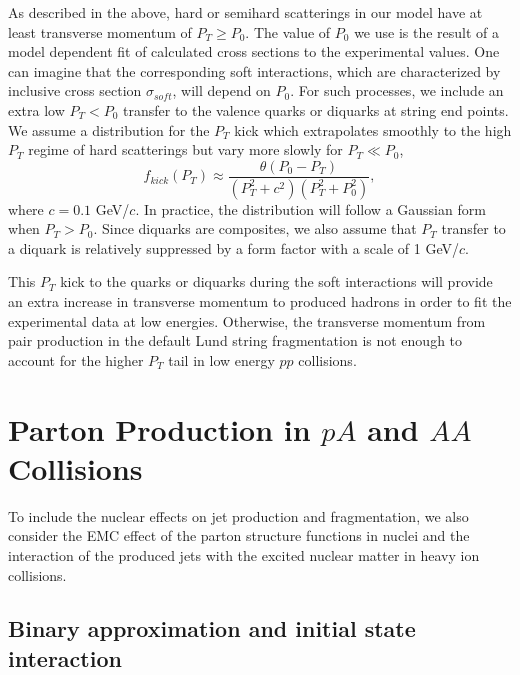         As described in the above, hard or semihard scatterings in our 
model have at least transverse momentum of $P_T\geq P_0$. The value of 
$P_0$ we use is the result of a model dependent fit of calculated cross 
sections to the experimental values. One can imagine that the 
corresponding soft interactions, which are characterized by inclusive
cross section $\sigma_{soft}$, will depend on $P_0$. For such 
processes, we include an extra low $P_T<P_0$ transfer to the 
valence quarks or diquarks at string end points. We assume a 
distribution for the $P_T$ kick which extrapolates smoothly to
the high $P_T$ regime of hard scatterings but vary more slowly
for $P_T\ll P_0$,
\begin{equation}
        f_{kick}(P_T)\approx\frac{\theta(P_0-P_T)}{(P_T^2+c^2)
        (P_T^2+P_{0}^2)},\label{eq:kick}
\end{equation}
where $c=0.1$ GeV/$c$. In practice, the distribution will follow
a Gaussian form when $P_T>P_0$. Since diquarks are composites, 
we also assume that $P_T$ transfer to a diquark is relatively 
suppressed by a form factor with a scale of 1 GeV/$c$.

        This $P_T$ kick to the quarks or diquarks during the soft 
interactions will provide an extra increase in transverse momentum 
to produced hadrons in order to fit the experimental data at low
energies\cite{hijing}. Otherwise, the transverse momentum from pair 
production in the default Lund string fragmentation is not enough 
to account for the higher $P_T$ tail in low energy $pp$ collisions.

\section{Parton Production in $pA$ and $AA$ Collisions}

        To include the nuclear effects on jet production and 
fragmentation, we also consider the EMC\cite{shadow1}
effect of the parton structure functions in nuclei and the 
interaction of the produced jets with the excited nuclear 
matter in heavy ion collisions. 


\subsection{Binary approximation and initial state interaction}



